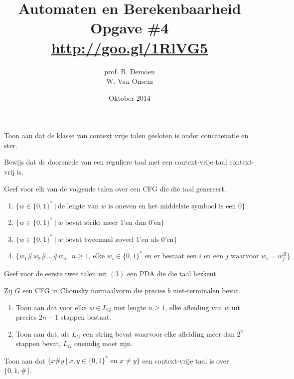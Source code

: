 \documentclass[a4paper]{article}
\title{Automaten en Berekenbaarheid\\Opgave \#4\\\url{http://goo.gl/1RlVG5}}
\author{prof. B. Demoen\\W. Van Onsem}
\date{Oktober 2014}
\begin{document}
\maketitle

\begin{question}
Toon aan dat de klasse van context vrije talen gesloten is onder concatenatie en ster.
\end{question}

\begin{question}
Bewijs dat de doorsnede van een reguliere taal met een context-vrije taal context-vrij is.
\end{question}

\begin{question}
Geef voor elk van de volgende talen over een CFG die die taal genereert.
\begin{enumerate}
  \item $\{ w \in \{0,1\}^* \ | \ \text{de lengte van $w$ is oneven en het middelste symbool is een $0$} \}$
  \item $\{ w \in \{0,1\}^* \ | \ \text{$w$ bevat strikt meer $1$'en dan $0$'en} \}$
  \item $\{ w \in \{0,1\}^* \ | \ \text{$w$ bevat tweemaal zoveel $1$'en als $0$'en} \}$
  \item $\{ w_1 \# w_2 \# \ldots \# w_n \ | \ \text{$n \geq 1$, elke $w_i \in \{0,1\}^*$ en er bestaat een $i$ en een $j$ waarvoor $w_i = w_j^\mathcal{R}$} \}$
\end{enumerate}
\end{question}

\begin{question}
Geef voor de eerste twee talen uit $(3)$ een PDA die die taal herkent.
\end{question}

\begin{question}
Zij $G$ een CFG in Chomsky normaalvorm die precies $b$ niet-terminalen bevat.
\begin{enumerate}
  \item Toon aan dat voor elke $w \in L_G$ met lengte $n \geq 1$, elke afleiding van $w$ uit precies $2n - 1$ stappen bestaat.
  \item Toon aan dat, als $L_G$ een string bevat waarvoor elke afleiding meer dan $2^b$ stappen bevat, $L_G$ oneindig moet zijn.
\end{enumerate}
\end{question}

\begin{question}
Toon aan dat $\{ x \# y \ | \ \text{$x,y \in \{0,1\}^*$ en $x \neq y$} \}$ een context-vrije taal is over $\{ 0,1,\# \}$.
\end{question}
\end{document}

